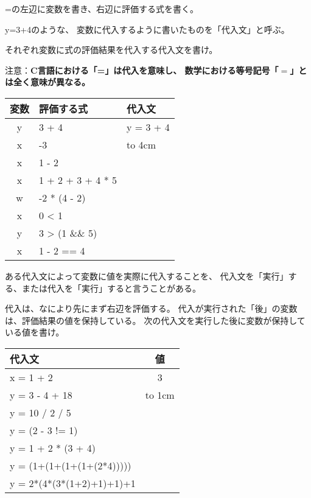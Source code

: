 \documentclass[12pt,a4j]{jarticle}
\newcounter{toi}
\def\toi{%
\bigskip\bigskip\noindent
\addtocounter{toi}{1}
\shadowbox{\bfseries\large 問\thetoi}
\nopagebreak[4]\bigskip\nopagebreak[4]
}
\begin{document}
{\ttfamily =}の左辺に変数を書き、右辺に評価する式を書く。



{\ttfamily y=3+4}のような、
変数に代入するように書いたものを「代入文」と呼ぶ。



\toi

それぞれ変数に式の評価結果を代入する代入文を書け。

\noindent
注意：{\bfseries C言語における「{\ttfamily =}」は代入を意味し、
数学における等号記号「$=$」とは全く意味が異なる。}

\begin{center}
 \ttfamily%
 \begin{tabular}{|c|l|l|}\hline
 変数 & 評価する式 & 代入文\\ \hline\hline
 y & 3 + 4 & y = 3 + 4\\ \hline
 x & -3 & \hbox to 4cm{}\\ \hline
 x & 1 - 2 & \\ \hline
 x & 1 + 2 + 3 + 4 * 5& \\ \hline
 w & -2 * (4 - 2) & \\ \hline
 x & 0 < 1 & \\ \hline
 y & 3 > (1 \&\& 5) & \\ \hline
 x & 1 - 2 == 4 & \\ \hline
 \end{tabular}
\end{center}






\toi

ある代入文によって変数に値を実際に代入することを、
代入文を「実行」する、または代入を「実行」すると言うことがある。

代入は、なにより先にまず右辺を評価する。
代入が実行された「後」の変数は、評価結果の値を保持している。
次の代入文を実行した後に変数が保持している値を書け。

\begin{center}
 \ttfamily%
 \begin{tabular}{|l|c|}\hline
 代入文 & 値 \\ \hline\hline
 x = 1 + 2 & 3\\ \hline
 y = 3 - 4 + 18 & \hbox to 1cm{}\\ \hline
 y = 10 / 2 / 5 & \\ \hline
 y = (2 - 3 != 1) & \\ \hline
 y = 1 + 2 * (3 + 4) & \\ \hline
 y = (1+(1+(1+(1+(2*4))))) & \\ \hline
 y = 2*(4*(3*(1+2)+1)+1)+1 & \\ \hline
 \end{tabular}
\end{center}
\end{document}
